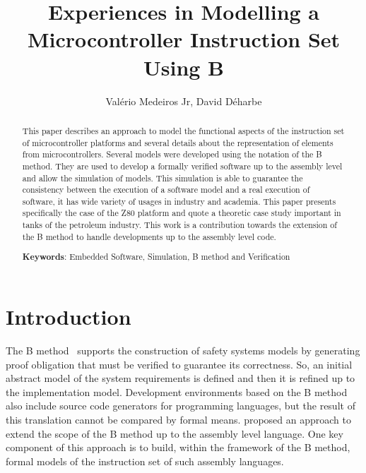 \documentclass[a4paper]{llncs}
\begin{document}
\title{Experiences in Modelling a Microcontroller Instruction Set Using B}
%
%
%
%
\author{Val\'{e}rio Medeiros Jr, David D\'{e}harbe}



\maketitle


\begin{abstract}

  This paper describes an approach to model the functional aspects of the instruction set of
  microcontroller platforms and several details about the representation of
  elements from microcontrollers.  Several models were developed using the notation of the B method. 
  They are used to develop a formally verified software up to the assembly level and allow the
  simulation of models. This simulation is able to guarantee the consistency between the execution
  of a software model and a real  execution of software, it has wide variety of usages in industry
  and academia. This paper presents specifically the case of the Z80 platform and quote a theoretic 
  case study important in tanks of the petroleum industry. This work is a contribution towards the
  extension of the B method to handle developments up to the assembly level code.
  
   \textbf{Keywords}: Embedded Software, Simulation, B method and Verification%
\end{abstract}


%

\section{Introduction}

The B method~\cite{Abrial} supports the construction of safety systems
models by generating proof obligation that must be verified to guarantee its correctness. So,
an initial abstract model of the system requirements is defined and
then it is refined up to the implementation model. Development
environments based on the B method also include source code generators
for programming languages, but the result of this translation
cannot be compared by formal means. \cite{Dantas_SBMF08} proposed
an approach to extend the scope of the B method up to the
assembly level language. One key component of this approach
is to build, within the framework of the B method, formal models of
the instruction set of such assembly languages. 
\end{document}
